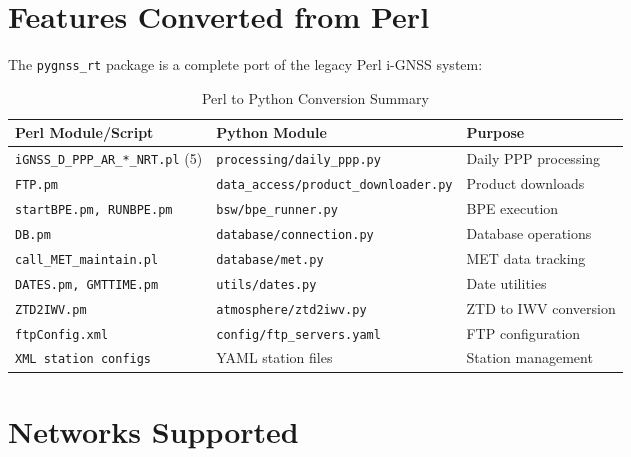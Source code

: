 \documentclass[11pt,a4paper,twoside]{report}
\begin{document}
\section{Features Converted from Perl}

The \texttt{pygnss\_rt} package is a complete port of the legacy Perl i-GNSS system:

\begin{table}[H]
\centering
\caption{Perl to Python Conversion Summary}
\label{tab:conversion}
\begin{tabular}{@{}lll@{}}
\toprule
\textbf{Perl Module/Script} & \textbf{Python Module} & \textbf{Purpose} \\
\midrule
\texttt{iGNSS\_D\_PPP\_AR\_*\_NRT.pl} (5) & \texttt{processing/daily\_ppp.py} & Daily PPP processing \\
\texttt{FTP.pm} & \texttt{data\_access/product\_downloader.py} & Product downloads \\
\texttt{startBPE.pm, RUNBPE.pm} & \texttt{bsw/bpe\_runner.py} & BPE execution \\
\texttt{DB.pm} & \texttt{database/connection.py} & Database operations \\
\texttt{call\_MET\_maintain.pl} & \texttt{database/met.py} & MET data tracking \\
\texttt{DATES.pm, GMTTIME.pm} & \texttt{utils/dates.py} & Date utilities \\
\texttt{ZTD2IWV.pm} & \texttt{atmosphere/ztd2iwv.py} & ZTD to IWV conversion \\
\texttt{ftpConfig.xml} & \texttt{config/ftp\_servers.yaml} & FTP configuration \\
\texttt{XML station configs} & YAML station files & Station management \\
\bottomrule
\end{tabular}
\end{table}

\section{Networks Supported}
\end{document}
